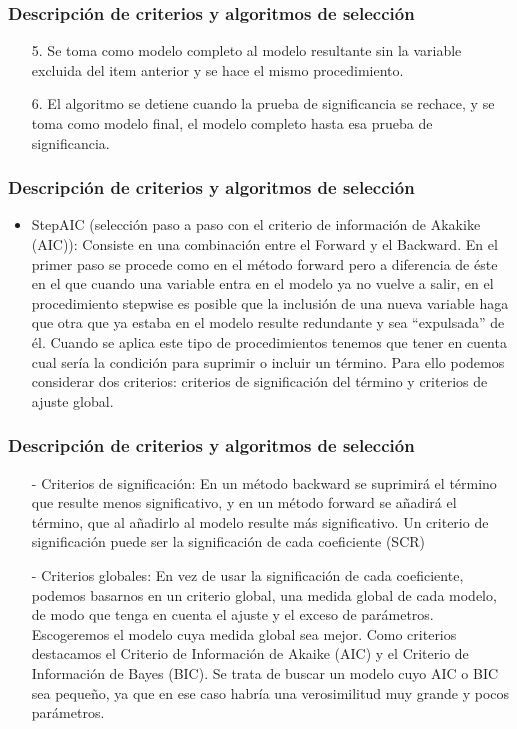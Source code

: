 \documentclass[12pt]{beamer}
\begin{document}
\begin{frame}
\frametitle{Descripción de criterios y algoritmos de selección}
\begin{itemize}
\item[5.] Se toma como modelo completo al modelo resultante sin la variable excluida del item anterior y se hace el mismo procedimiento. 
\item[6.] El algoritmo se detiene cuando la prueba de significancia se rechace, y se toma como modelo final, el modelo completo hasta esa prueba de significancia.
\end{itemize}
\end{frame}

\begin{frame}
\frametitle{Descripción de criterios y algoritmos de selección}
\begin{itemize}
\item StepAIC (selección paso a paso con el criterio de información de Akakike (AIC)): Consiste en una combinación entre el Forward y el Backward. En el primer paso se procede como en el método forward pero a diferencia de éste en el que cuando una variable entra en el modelo ya no vuelve a salir, en el procedimiento stepwise es posible que la inclusión de una nueva variable haga que otra que ya estaba en el modelo resulte redundante y sea ``expulsada'' de él.
Cuando se aplica este tipo de procedimientos tenemos que tener en cuenta cual sería la condición para suprimir o incluir un término. Para ello podemos considerar dos criterios: criterios de significación del término y criterios de ajuste global.
\end{itemize}
\end{frame}

\begin{frame}
\frametitle{Descripción de criterios y algoritmos de selección}
\begin{itemize}
\item[-] Criterios de significación: En un método backward se suprimirá el término que resulte menos significativo, y en un método forward se añadirá el término, que al añadirlo al modelo resulte más significativo. Un criterio de significación puede ser la significación de cada coeficiente (SCR)
\item[-] Criterios globales: En vez de usar la significación de cada coeficiente, podemos basarnos en un criterio global, una medida global de cada modelo, de modo que tenga en cuenta el ajuste y el exceso de parámetros. Escogeremos el modelo cuya medida global sea mejor. Como criterios destacamos el Criterio de Información de Akaike (AIC) y el Criterio de Información de Bayes (BIC). Se trata de buscar un modelo cuyo AIC o BIC sea pequeño, ya que en ese caso habría una verosimilitud muy grande y pocos parámetros.
\end{itemize}
\end{frame}
\end{document}
